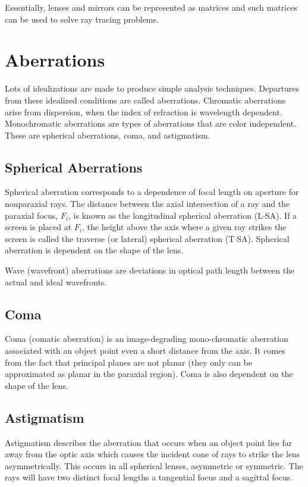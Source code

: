 \documentclass[12pt]{report}
\begin{document}
Essentially, lenses and mirrors can be represented as matrices and such matrices can be used to solve ray tracing problems. 

\section{Aberrations} 

Lots of idealizations are made to produce simple analysis techniques. Departures from these idealized conditions are called aberrations. Chromatic aberrations arise from dispersion, when the index of refraction is wavelength dependent. Monochromatic aberrations are types of aberrations that are color independent. These are spherical aberrations, coma, and astigmatism. 

\subsection{Spherical Aberrations}
Spherical aberration corresponds to a dependence of focal length on aperture for nonparaxial rays. The distance between the axial intersection of a ray and the paraxial  focus, $F_i$, is known as the longitudinal spherical aberration (L$\cdot$SA). If a screen is placed at $F_i$, the height above the axis where a given ray strikes the screen is called the traverse (or lateral) spherical aberration (T$\cdot$SA). Spherical aberration is dependent on the shape of the lens. 

Wave (wavefront) aberrations are deviations in optical path length between the actual and ideal wavefronts.

\subsection{Coma}
Coma (comatic aberration) is an image-degrading mono-chromatic aberration associated with an object point even a short distance from the axis. It comes from the fact that principal planes are not planar (they only can be approximated as planar in the paraxial region). Coma is also dependent on the shape of the lens. 

\subsection{Astigmatism}
Astigmatism describes the aberration that occurs when an object point lies far away from the optic axis which causes the incident cone of rays to strike the lens asymmetrically. This occurs in all spherical lenses, asymmetric or symmetric. The rays will have two distinct focal lengths a tangential focus and a sagittal focus. 
\end{document}
